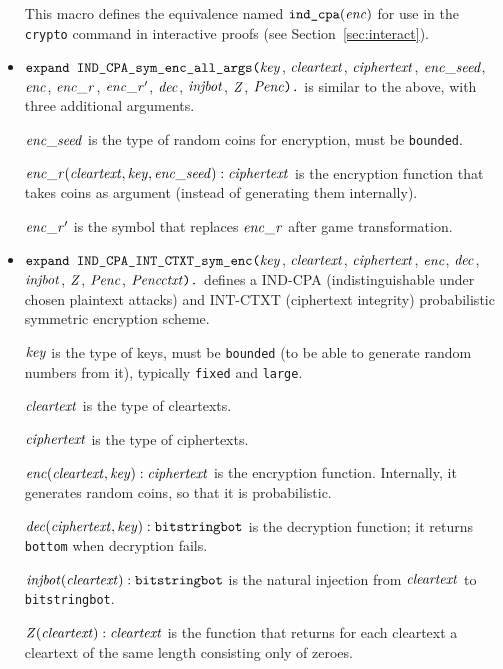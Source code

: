 \documentclass{article}
\begin{document}
\begin{itemize}
   This macro defines the equivalence named $\texttt{ind\_cpa}(\mathit{enc})$
   for use in the \texttt{crypto} command in interactive proofs
   (see Section~\ref{sec:interact}).

\item $\texttt{expand IND\_CPA\_sym\_enc\_all\_args(}\mathit{key}$,
  $\mathit{cleartext}$, $\mathit{ciphertext}$, $\mathit{enc\_seed}$, $\mathit{enc}$, $\mathit{enc\_r}$, $\mathit{enc\_r}'$,
  $\mathit{dec}$, $\mathit{injbot}$, $\mathit{Z}$, $\mathit{Penc}\texttt{).}$ is similar to the above,
  with three additional arguments. 

  $\mathit{enc\_seed}$ is the type of random coins for encryption, must be \texttt{bounded}.

  $\mathit{enc\_r}(\mathit{cleartext}, \mathit{key}, \mathit{enc\_seed}): \mathit{ciphertext}$ is the encryption function that takes coins as argument (instead of generating them internally).

  $\mathit{enc\_r}'$ is the symbol that replaces $\mathit{enc\_r}$ after game transformation.

\item $\texttt{expand IND\_CPA\_INT\_CTXT\_sym\_enc(}\mathit{key}$,
  $\mathit{cleartext}$, $\mathit{ciphertext}$, $\mathit{enc}$,
  $\mathit{dec}$, $\mathit{injbot}$, $\mathit{Z}$, $\mathit{Penc}$, $\mathit{Pencctxt}\texttt{).}$ defines a
  IND-CPA (indistinguishable under chosen plaintext attacks) and INT-CTXT (ciphertext integrity)
  probabilistic symmetric encryption scheme.

   $\mathit{key}$ is the type of keys, must be \texttt{bounded} (to be able to generate random numbers from it), typically \texttt{fixed} and \texttt{large}.

   $\mathit{cleartext}$ is the type of cleartexts.

   $\mathit{ciphertext}$ is the type of ciphertexts.

   $\mathit{enc}(\mathit{cleartext}, \mathit{key}): \mathit{ciphertext}$ is the encryption function. Internally, it generates random coins, so that it is probabilistic.

   $\mathit{dec}(\mathit{ciphertext}, \mathit{key}): \texttt{bitstringbot}$ is the
  decryption function; it returns \texttt{bottom} when decryption
  fails.

   $\mathit{injbot}(\mathit{cleartext}): \texttt{bitstringbot}$ is the natural
  injection from $\mathit{cleartext}$ to \texttt{bitstringbot}.

   $\mathit{Z}(\mathit{cleartext}): \mathit{cleartext}$ is the function that
  returns for each cleartext a cleartext of the same length consisting
  only of zeroes.


\end{itemize}
\end{document}
